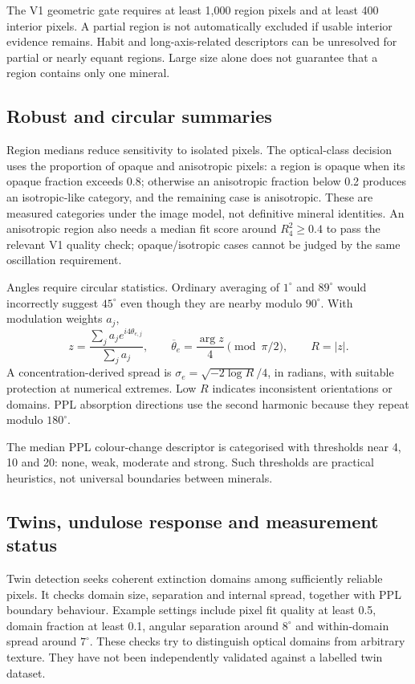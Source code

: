 The V1 geometric gate requires at least 1,000 region pixels and at least 400 interior pixels. A partial region is not automatically excluded if usable interior evidence remains. Habit and long-axis-related descriptors can be unresolved for partial or nearly equant regions. Large size alone does not guarantee that a region contains only one mineral.

\subsection{Robust and circular summaries}
Region medians reduce sensitivity to isolated pixels. The optical-class decision uses the proportion of opaque and anisotropic pixels: a region is opaque when its opaque fraction exceeds 0.8; otherwise an anisotropic fraction below 0.2 produces an isotropic-like category, and the remaining case is anisotropic. These are measured categories under the image model, not definitive mineral identities. An anisotropic region also needs a median fit score around $R_4^2\geq0.4$ to pass the relevant V1 quality check; opaque/isotropic cases cannot be judged by the same oscillation requirement.

Angles require circular statistics. Ordinary averaging of $1^\circ$ and $89^\circ$ would incorrectly suggest $45^\circ$ even though they are nearby modulo $90^\circ$. With modulation weights $a_j$,
\begin{equation}
z=\frac{\sum_j a_j e^{i4\theta_{e,j}}}{\sum_j a_j},\qquad
\overline\theta_e=\frac{\arg z}{4}\pmod{\pi/2},\qquad R=|z|.
\end{equation}
A concentration-derived spread is $\sigma_e=\sqrt{-2\log R}/4$, in radians, with suitable protection at numerical extremes. Low $R$ indicates inconsistent orientations or domains. PPL absorption directions use the second harmonic because they repeat modulo $180^\circ$.

The median PPL colour-change descriptor is categorised with thresholds near 4, 10 and 20: none, weak, moderate and strong. Such thresholds are practical heuristics, not universal boundaries between minerals.

\subsection{Twins, undulose response and measurement status}
Twin detection seeks coherent extinction domains among sufficiently reliable pixels. It checks domain size, separation and internal spread, together with PPL boundary behaviour. Example settings include pixel fit quality at least 0.5, domain fraction at least 0.1, angular separation around $8^\circ$ and within-domain spread around $7^\circ$. These checks try to distinguish optical domains from arbitrary texture. They have not been independently validated against a labelled twin dataset.

